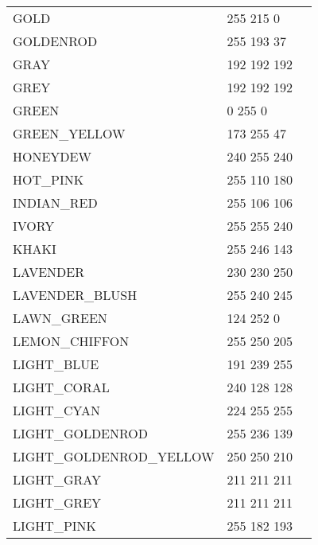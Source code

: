 \documentclass{article}
\begin{document}
\begin{longtable}{lll}
GOLD & 255 215 0 & \colorbox[RGB]{255 215 0}{\phantom{MMMMMMMM}}\\
GOLDENROD & 255 193 37 & \colorbox[RGB]{255 193 37}{\phantom{MMMMMMMM}}\\
GRAY & 192 192 192 & \colorbox[RGB]{192 192 192}{\phantom{MMMMMMMM}}\\
GREY & 192 192 192 & \colorbox[RGB]{192 192 192}{\phantom{MMMMMMMM}}\\
GREEN & 0 255 0 & \colorbox[RGB]{0 255 0}{\phantom{MMMMMMMM}}\\
GREEN\_YELLOW & 173 255 47 & \colorbox[RGB]{173 255 47}{\phantom{MMMMMMMM}}\\
HONEYDEW & 240 255 240 & \colorbox[RGB]{240 255 240}{\phantom{MMMMMMMM}}\\
HOT\_PINK & 255 110 180 & \colorbox[RGB]{255 110 180}{\phantom{MMMMMMMM}}\\
INDIAN\_RED & 255 106 106 & \colorbox[RGB]{255 106 106}{\phantom{MMMMMMMM}}\\
IVORY & 255 255 240 & \colorbox[RGB]{255 255 240}{\phantom{MMMMMMMM}}\\
KHAKI & 255 246 143 & \colorbox[RGB]{255 246 143}{\phantom{MMMMMMMM}}\\
LAVENDER & 230 230 250 & \colorbox[RGB]{230 230 250}{\phantom{MMMMMMMM}}\\
LAVENDER\_BLUSH & 255 240 245 & \colorbox[RGB]{255 240 245}{\phantom{MMMMMMMM}}\\
LAWN\_GREEN & 124 252 0 & \colorbox[RGB]{124 252 0}{\phantom{MMMMMMMM}}\\
LEMON\_CHIFFON & 255 250 205 & \colorbox[RGB]{255 250 205}{\phantom{MMMMMMMM}}\\
LIGHT\_BLUE & 191 239 255 & \colorbox[RGB]{191 239 255}{\phantom{MMMMMMMM}}\\
LIGHT\_CORAL & 240 128 128 & \colorbox[RGB]{240 128 128}{\phantom{MMMMMMMM}}\\
LIGHT\_CYAN & 224 255 255 & \colorbox[RGB]{224 255 255}{\phantom{MMMMMMMM}}\\
LIGHT\_GOLDENROD & 255 236 139 & \colorbox[RGB]{255 236 139}{\phantom{MMMMMMMM}}\\
LIGHT\_GOLDENROD\_YELLOW & 250 250 210 & \colorbox[RGB]{250 250 210}{\phantom{MMMMMMMM}}\\
LIGHT\_GRAY & 211 211 211 & \colorbox[RGB]{211 211 211}{\phantom{MMMMMMMM}}\\
LIGHT\_GREY & 211 211 211 & \colorbox[RGB]{211 211 211}{\phantom{MMMMMMMM}}\\
LIGHT\_PINK & 255 182 193 & \colorbox[RGB]{255 182 193}{\phantom{MMMMMMMM}}\\

\end{longtable}
\end{document}
